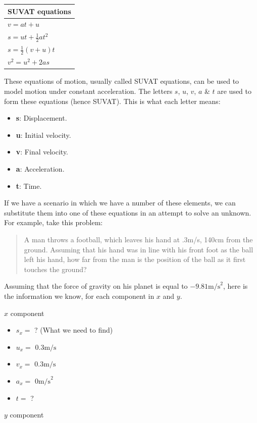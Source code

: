 \begin{longtable}[]{@{}l@{}}
\toprule
SUVAT equations\tabularnewline
\midrule
\endhead
\(v=at+u\)\tabularnewline
\(s=ut+\frac{1}{2}at^2\)\tabularnewline
\(s=\frac{1}{2}(v+u)t\)\tabularnewline
\(v^2=u^2+2as\)\tabularnewline
\bottomrule
\end{longtable}

These equations of motion, usually called SUVAT equations, can be used to model motion under constant acceleration. The letters \(s\), \(u\), \(v\), \(a\) \& \(t\) are used to form these equations (hence SUVAT). This is what each letter means:

\begin{itemize}
\tightlist
\item
  \textbf{s}: Displacement.
\item
  \textbf{u}: Initial velocity.
\item
  \textbf{v}: Final velocity.
\item
  \textbf{a}: Acceleration.
\item
  \textbf{t}: Time.
\end{itemize}

If we have a scenario in which we have a number of these elements, we can substitute them into one of these equations in an attempt to solve an unknown. For example, take this problem:

\begin{quote}
A man throws a football, which leaves his hand at .3m/s, 140cm from the ground. Assuming that his hand was in line with his front foot as the ball left his hand, how far from the man is the position of the ball as it first touches the ground?
\end{quote}

Assuming that the force of gravity on his planet is equal to \(-9.81\mathrm{m/s}^2\), here is the information we know, for each component in \(x\) and \(y\).

\(x\) component

\begin{itemize}
\tightlist
\item
  \(s_{x}=\) ? (What we need to find)
\item
  \(u_{x}=\) \(0.3\mathrm{m/s}\)
\item
  \(v_{x}=\) \(0.3\mathrm{m/s}\)
\item
  \(a_{x}=\) \(0\mathrm{m/s}^2\)
\item
  \(t=\) ?
\end{itemize}

\(y\) component

